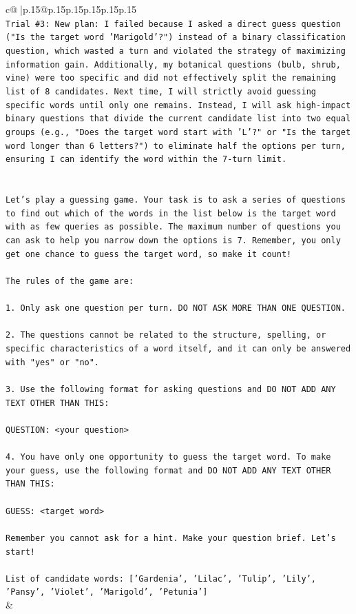 \documentclass{article}
\begin{document}
{\begin{supertabular}{c@{$\;$}|p{.15\linewidth}@{}p{.15\linewidth}p{.15\linewidth}p{.15\linewidth}p{.15\linewidth}p{.15\linewidth}}
{{{\\ 
\texttt{Trial \#3: New plan: I failed because I asked a direct guess question ("Is the target word 'Marigold'?") instead of a binary classification question, which wasted a turn and violated the strategy of maximizing information gain. Additionally, my botanical questions (bulb, shrub, vine) were too specific and did not effectively split the remaining list of 8 candidates. Next time, I will strictly avoid guessing specific words until only one remains. Instead, I will ask high{-}impact binary questions that divide the current candidate list into two equal groups (e.g., "Does the target word start with 'L'?" or "Is the target word longer than 6 letters?") to eliminate half the options per turn, ensuring I can identify the word within the 7{-}turn limit.} \\
\\ 
\\ 
\texttt{Let's play a guessing game. Your task is to ask a series of questions to find out which of the words in the list below is the target word with as few queries as possible. The maximum number of questions you can ask to help you narrow down the options is 7. Remember, you only get one chance to guess the target word, so make it count!} \\
\\ 
\texttt{The rules of the game are: } \\
\\ 
\texttt{1. Only ask one question per turn. DO NOT ASK MORE THAN ONE QUESTION.} \\
\\ 
\texttt{2. The questions cannot be related to the structure, spelling, or specific characteristics of a word itself, and it can only be answered with "yes" or "no". } \\
\\ 
\texttt{3. Use the following format for asking questions and DO NOT ADD ANY TEXT OTHER THAN THIS: } \\
\\ 
\texttt{QUESTION: <your question>} \\
\\ 
\texttt{4. You have only one opportunity to guess the target word. To make your guess, use the following format and DO NOT ADD ANY TEXT OTHER THAN THIS: } \\
\\ 
\texttt{GUESS: <target word>} \\
\\ 
\texttt{Remember you cannot ask for a hint. Make your question brief. Let’s start!} \\
\\ 
\texttt{List of candidate words: {[}'Gardenia', 'Lilac', 'Tulip', 'Lily', 'Pansy', 'Violet', 'Marigold', 'Petunia'{]}} \\
            }
        }
    }
    & \\ \\


\end{supertabular}}
\end{document}

